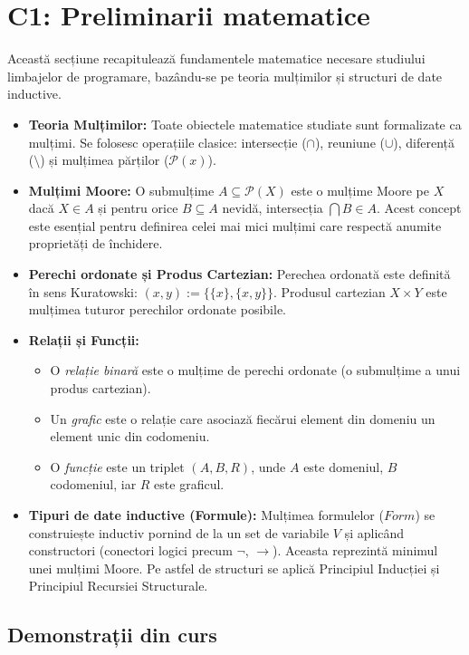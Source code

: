 \section*{C1: Preliminarii matematice}

Această secțiune recapitulează fundamentele matematice necesare studiului limbajelor de programare, bazându-se pe teoria mulțimilor și structuri de date inductive.

\begin{itemize}
	\item \textbf{Teoria Mulțimilor:} Toate obiectele matematice studiate sunt formalizate ca mulțimi. Se folosesc operațiile clasice: intersecție ($\cap$), reuniune ($\cup$), diferență ($\setminus$) și mulțimea părților ($\mathcal{P}(x)$).
	\item \textbf{Mulțimi Moore:} O submulțime $A \subseteq \mathcal{P}(X)$ este o mulțime Moore pe $X$ dacă $X \in A$ și pentru orice $B \subseteq A$ nevidă, intersecția $\bigcap B \in A$. Acest concept este esențial pentru definirea celei mai mici mulțimi care respectă anumite proprietăți de închidere.
	\item \textbf{Perechi ordonate și Produs Cartezian:} Perechea ordonată este definită în sens Kuratowski: $(x,y) := \{\{x\}, \{x,y\}\}$. Produsul cartezian $X \times Y$ este mulțimea tuturor perechilor ordonate posibile.
	\item \textbf{Relații și Funcții:}
	      \begin{itemize}
		      \item O \textit{relație binară} este o mulțime de perechi ordonate (o submulțime a unui produs cartezian).
		      \item Un \textit{grafic} este o relație care asociază fiecărui element din domeniu un element unic din codomeniu.
		      \item O \textit{funcție} este un triplet $(A, B, R)$, unde $A$ este domeniul, $B$ codomeniul, iar $R$ este graficul.
	      \end{itemize}
	\item \textbf{Tipuri de date inductive (Formule):} Mulțimea formulelor ($Form$) se construiește inductiv pornind de la un set de variabile $V$ și aplicând constructori (conectori logici precum $\neg$, $\rightarrow$). Aceasta reprezintă minimul unei mulțimi Moore. Pe astfel de structuri se aplică Principiul Inducției și Principiul Recursiei Structurale.
\end{itemize}

\subsection{Demonstrații din curs}

